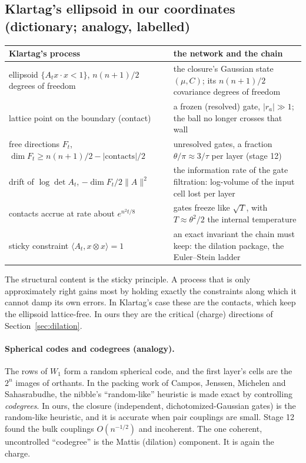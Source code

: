 \subsection{Klartag's ellipsoid in our coordinates (dictionary; analogy, labelled)}
\begin{center}\small
\begin{tabular}{>{\raggedright\arraybackslash}p{5.0cm}>{\raggedright\arraybackslash}p{8.8cm}}\toprule
Klartag's process & the network and the chain\\\midrule
ellipsoid $\{A_tx\cdot x<1\}$, $n(n+1)/2$ degrees of freedom & the closure's Gaussian state $(\mu,C)$; its $n(n+1)/2$ covariance degrees of freedom\\
lattice point on the boundary (contact) & a frozen (resolved) gate, $|r_a|\gg1$; the ball no longer crosses that wall\\
free directions $F_t$, $\dim F_t\ge n(n+1)/2-|\text{contacts}|/2$ & unresolved gates, a fraction $\theta/\pi\approx3/\tau$ per layer (stage 12)\\
drift of $\log\det A_t$, $-\dim F_t/2\|A\|^2$ & the information rate of the gate filtration: log-volume of the input cell lost per layer\\
contacts accrue at rate about $e^{n^2t/8}$ & gates freeze like $\sqrt T$, with $T\approx\theta^2/2$ the internal temperature\\
sticky constraint $\langle A_t,x\otimes x\rangle=1$ & an exact invariant the chain must keep: the dilation package, the Euler--Stein ladder\\\bottomrule
\end{tabular}
\end{center}
The structural content is the sticky principle. A process that is only approximately right gains most by holding exactly the
constraints along which it cannot damp its own errors. In Klartag's case these are the contacts, which keep the ellipsoid lattice-free.
In ours they are the critical (charge) directions of Section~\ref{sec:dilation}.

\paragraph{Spherical codes and codegrees (analogy).} The rows of $W_1$ form a random spherical code, and the first layer's cells are
the $2^n$ images of orthants. In the packing work of Campos, Jenssen, Michelen and Sahasrabudhe, the nibble's ``random-like''
heuristic is made exact by controlling \emph{codegrees}. In ours, the closure (independent, dichotomized-Gaussian gates) is the random-like heuristic, and it is
accurate when pair couplings are small. Stage 12 found the bulk couplings $O(n^{-1/2})$ and incoherent. The one coherent,
uncontrolled ``codegree'' is the Mattis (dilation) component. It is again the charge.
